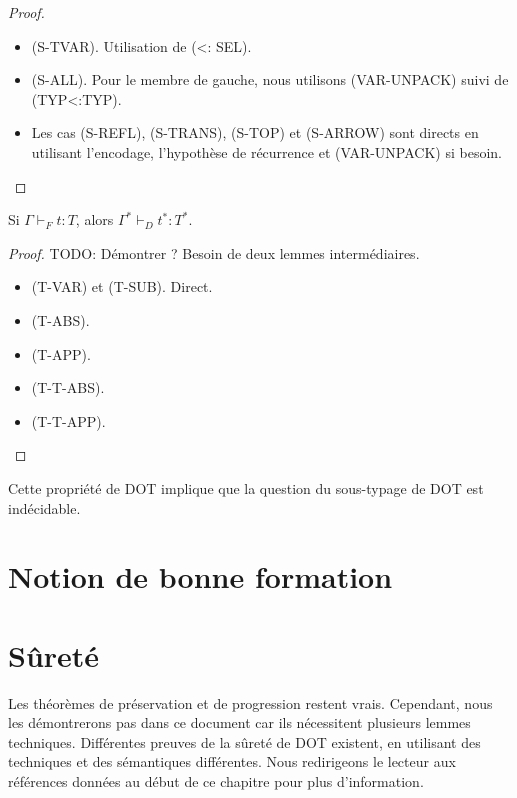\begin{proof}
  \begin{itemize}
  \item (S-TVAR). Utilisation de (<: SEL).
  \item (S-ALL). Pour le membre de gauche, nous utilisons (VAR-UNPACK) suivi de
    (TYP<:TYP).
  \item Les cas (S-REFL), (S-TRANS), (S-TOP) et (S-ARROW) sont directs
    en utilisant l'encodage, l'hypothèse de récurrence et (VAR-UNPACK)
    si besoin.
  \end{itemize}
\end{proof}

\begin{theorem}
  Si $\Gamma \vdash_{F} t : T$, alors $\Gamma^{*} \vdash_{D} t^{*} : T^{*}$.
\end{theorem}

\begin{proof}
  TODO: Démontrer ? Besoin de deux lemmes intermédiaires.
  \begin{itemize}
  \item (T-VAR) et (T-SUB). Direct.
  \item (T-ABS).
  \item (T-APP).
  \item (T-T-ABS).
  \item (T-T-APP).
  \end{itemize}
\end{proof}

Cette propriété de DOT implique que la question du sous-typage de DOT est
indécidable.

\section{Notion de bonne formation}

\section{Sûreté}

Les théorèmes de préservation et de progression
restent vrais. Cependant, nous les démontrerons pas dans ce document car ils
nécessitent plusieurs lemmes techniques. Différentes preuves de la sûreté de DOT
existent, en utilisant des techniques et des sémantiques différentes. Nous
redirigeons le lecteur aux références données au début de ce chapitre pour plus d'information.